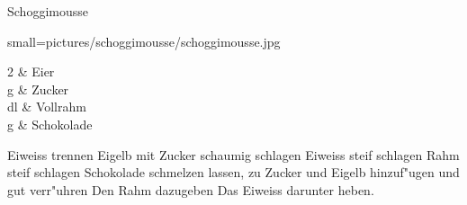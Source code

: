 \begin{recipe}
	[
	preparationtime = {\unit[20]{min}},
	portion,
	calory,
	source
	]
	{Schoggimousse}
	
	\graph
	{
		small=pictures/schoggimousse/schoggimousse.jpg
	}
	
	\ingredients
	{
		2 & Eier \\
		\unit[50]{g} & Zucker \\
		\unit[5]{dl} & Vollrahm \\
		\unit[200]{g} & Schokolade \\
	}
	
	\preparation
	{
		\step Eiweiss trennen
		\step Eigelb mit Zucker schaumig schlagen
		\step Eiweiss steif schlagen
		\step Rahm steif schlagen
		\step Schokolade schmelzen lassen, zu Zucker und Eigelb hinzuf"ugen und gut verr"uhren
		\step Den Rahm dazugeben
		\step Das Eiweiss darunter heben.
	}
\end{recipe}